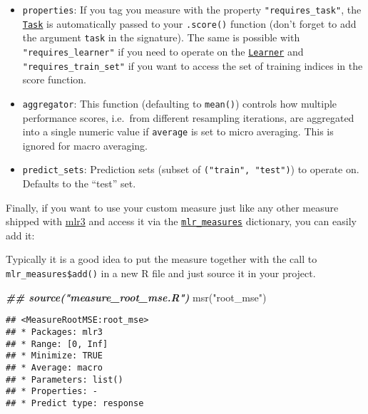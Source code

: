 \documentclass[
]{scrbook}
\newenvironment{Shaded}{\begin{snugshade}}{\end{snugshade}}
\newcommand{\DocumentationTok}[1]{\textcolor[rgb]{0.56,0.35,0.01}{\textbf{\textit{#1}}}}
\newcommand{\FunctionTok}[1]{\textcolor[rgb]{0.00,0.00,0.00}{#1}}
\newcommand{\NormalTok}[1]{#1}
\newcommand{\SpecialCharTok}[1]{\textcolor[rgb]{0.00,0.00,0.00}{#1}}
\newcommand{\StringTok}[1]{\textcolor[rgb]{0.31,0.60,0.02}{#1}}
\providecommand{\tightlist}{%
  \setlength{\itemsep}{0pt}\setlength{\parskip}{0pt}}
\renewenvironment{Shaded} {\begin{snugshade}\small} {\end{snugshade}}
\begin{document}
\begin{itemize}
\tightlist
\item
  \texttt{properties}: If you tag you measure with the property \texttt{"requires\_task"}, the \href{https://mlr3.mlr-org.com/reference/Task.html}{\texttt{Task}} is automatically passed to your \texttt{.score()} function (don't forget to add the argument \texttt{task} in the signature).
  The same is possible with \texttt{"requires\_learner"} if you need to operate on the \href{https://mlr3.mlr-org.com/reference/Learner.html}{\texttt{Learner}} and \texttt{"requires\_train\_set"} if you want to access the set of training indices in the score function.
\item
  \texttt{aggregator}: This function (defaulting to \texttt{mean()}) controls how multiple performance scores, i.e.~from different resampling iterations, are aggregated into a single numeric value if \texttt{average} is set to micro averaging.
  This is ignored for macro averaging.
\item
  \texttt{predict\_sets}: Prediction sets (subset of \texttt{("train",\ "test")}) to operate on.
  Defaults to the ``test'' set.
\end{itemize}

Finally, if you want to use your custom measure just like any other measure shipped with \href{https://mlr3.mlr-org.com}{mlr3} and access it via the \href{https://mlr3.mlr-org.com/reference/mlr_measures.html}{\texttt{mlr\_measures}} dictionary, you can easily add it:

\begin{Shaded}
\end{Shaded}

Typically it is a good idea to put the measure together with the call to \texttt{mlr\_measures\$add()} in a new R file and just source it in your project.

\begin{Shaded}
\begin{Highlighting}[]
\DocumentationTok{\#\# source("measure\_root\_mse.R")}
\FunctionTok{msr}\NormalTok{(}\StringTok{"root\_mse"}\NormalTok{)}
\end{Highlighting}
\end{Shaded}

\begin{verbatim}
## <MeasureRootMSE:root_mse>
## * Packages: mlr3
## * Range: [0, Inf]
## * Minimize: TRUE
## * Average: macro
## * Parameters: list()
## * Properties: -
## * Predict type: response
\end{verbatim}
\end{document}
